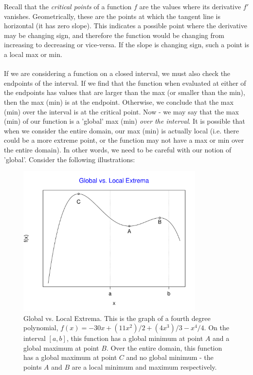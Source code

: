 \documentclass[12pt,a4paper]{article} %
\begin{document}
Recall that the \emph{critical points} of a function $f$ are the values where its derivative $f'$ vanishes.  Geometrically, these are the points at which the tangent line is horizontal (it has zero slope).  This indicates a possible point where the derivative may be changing sign, and therefore the function would be changing from increasing to decreasing or vice-versa.  If the slope is changing sign, such a point is a local max or min.  \\\\

If we are considering a function on a closed interval, we must also check the endpoints of the interval.  If we find that the function when evaluated at either of the endpoints has values that are larger than the max (or smaller than the min), then the max (min) is at the endpoint.  Otherwise, we conclude that the max (min) over the interval is at the critical point.  Now - we may say that the max (min) of our function is a 'global' max (min) \emph{over the interval}.  It is possible that when we consider the entire domain, our max (min) is actually local (i.e. there could be a more extreme point, or the function may not have a max or min over the entire domain).  In other words, we need to be careful with our notion of 'global'. Consider the following illustrations:
\begin{figure}[H]
\includegraphics[height=3in]{Extrema1.pdf}
\caption{Global vs. Local Extrema.  This is the graph of a fourth degree polynomial, $f(x)= -30x + (11x^2)/2 + (4x^3)/3 - x^4/4$.   On the interval $[a,b]$, this function has a global minimum at point $A$ and a global maximum at point $B$.  Over the entire domain, this function has a global maximum at point $C$ and no global minimum - the points $A$ and $B$ are a local minimum and maximum respectively.}
\end{figure}
\end{document}
